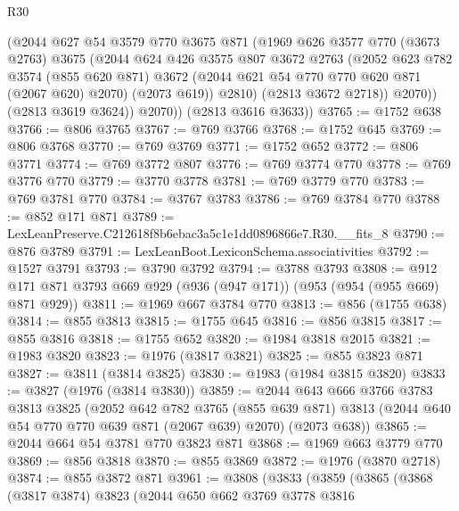 \begin{lexlean}{R30}
\begin{coremodule}
              (@2044
                @627
                @54
                @3579
                @770
                @3675
                @871
                (@1969
                  @626
                  @3577
                  @770
                  (@3673 @2763)
                  @3675
                  (@2044
                    @624
                    @426
                    @3575
                    @807
                    @3672
                    @2763
                    (@2052
                      @623
                      @782
                      @3574
                      (@855 @620 @871)
                      @3672
                      (@2044 @621 @54 @770 @770 @620 @871 (@2067 @620) @2070)
                      (@2073 @619))
                    @2810)
                  (@2813 @3672 @2718))
                @2070))
            (@2813 @3619 @3624))
          @2070))
      (@2813 @3616 @3633))
@3765 := @1752 @638
@3766 := @806 @3765
@3767 := @769 @3766
@3768 := @1752 @645
@3769 := @806 @3768
@3770 := @769 @3769
@3771 := @1752 @652
@3772 := @806 @3771
@3774 := @769 @3772 @807
@3776 := @769 @3774 @770
@3778 := @769 @3776 @770
@3779 := @3770 @3778
@3781 := @769 @3779 @770
@3783 := @769 @3781 @770
@3784 := @3767 @3783
@3786 := @769 @3784 @770
@3788 := @852 @171 @871
@3789 := LexLeanPreserve.C212618f8b6ebac3a5c1e1dd0896866e7.R30.__fits_8
@3790 := @876 @3789
@3791 := LexLeanBoot.LexiconSchema.associativities
@3792 := @1527 @3791
@3793 := @3790 @3792
@3794 := @3788 @3793
@3808 := @912 @171 @871 @3793 @669 @929 (@936 (@947 @171)) (@953 (@954 (@955 @669) @871 @929))
@3811 := @1969 @667 @3784 @770
@3813 := @856 (@1755 @638)
@3814 := @855 @3813
@3815 := @1755 @645
@3816 := @856 @3815
@3817 := @855 @3816
@3818 := @1755 @652
@3820 := @1984 @3818 @2015
@3821 := @1983 @3820
@3823 := @1976 (@3817 @3821)
@3825 := @855 @3823 @871
@3827 := @3811 (@3814 @3825)
@3830 := @1983 (@1984 @3815 @3820)
@3833 := @3827 (@1976 (@3814 @3830))
@3859 := @2044
    @643
    @666
    @3766
    @3783
    @3813
    @3825
    (@2052
      @642
      @782
      @3765
      (@855 @639 @871)
      @3813
      (@2044 @640 @54 @770 @770 @639 @871 (@2067 @639) @2070)
      (@2073 @638))
@3865 := @2044 @664 @54 @3781 @770 @3823 @871
@3868 := @1969 @663 @3779 @770
@3869 := @856 @3818
@3870 := @855 @3869
@3872 := @1976 (@3870 @2718)
@3874 := @855 @3872 @871
@3961 := @3808
    (@3833
      (@3859
        (@3865
          (@3868
            (@3817 @3874)
            @3823
            (@2044
              @650
              @662
              @3769
              @3778
              @3816

\end{coremodule}
\end{lexlean}
